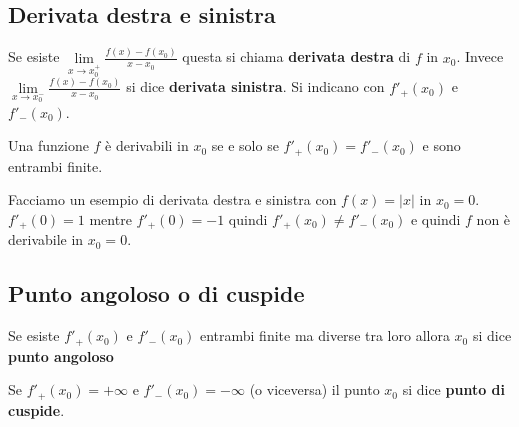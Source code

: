\subsection{Derivata destra e sinistra}
\begin{definition}
    Se esiste $\lim\limits_{x\to x^+_0}\frac{f(x) - f(x_0)}{x - x_0}$ questa si chiama \textbf{derivata destra} di $f$ in $x_0$. Invece $\lim\limits_{x\to x^-_0}\frac{f(x) - f(x_0)}{x - x_0}$ si dice \textbf{derivata sinistra}. Si indicano con $f'_+(x_0)$ e $f'_-(x_0)$.
\end{definition}

\begin{observation}
Una funzione $f$ è derivabili in $x_0$ se e solo se $f'_+(x_0) = f'_-(x_0)$ e sono entrambi finite.
\end{observation}

\begin{example}
Facciamo un esempio di derivata destra e sinistra con $f(x) = |x|$ in $x_0 = 0$.\\
$f'_+(0) = 1$ mentre $f'_+(0) = -1$ quindi $f'_+(x_0) \neq f'_-(x_0)$ e quindi $f$ non è derivabile in $x_0 = 0$.
\end{example}

\subsection{Punto angoloso o di cuspide}
\begin{definition}
    Se esiste $f'_+(x_0)$ e $f'_-(x_0)$ entrambi finite ma diverse tra loro allora $x_0$ si dice \textbf{punto angoloso}
\end{definition}
\begin{definition}
    Se $f'_+(x_0) = +\infty$ e $f'_-(x_0) = -\infty$ (o viceversa) il punto $x_0$ si dice \textbf{punto di cuspide}. 
\end{definition}

